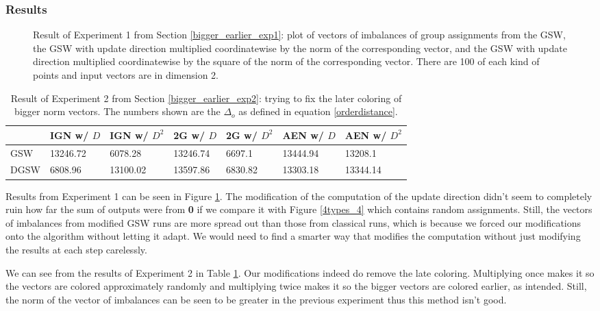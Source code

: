 \documentclass[12pt]{article}
\begin{document}
\subsubsection{Results}
\begin{figure}[h!]

\caption{Result of Experiment 1 from Section \ref{bigger_earlier_exp1}: plot of vectors of imbalances of group assignments from the GSW, the GSW with update direction multiplied coordinatewise by the norm of the corresponding vector, and the GSW with update direction multiplied coordinatewise by the square of the norm of the corresponding vector. There are 100 of each kind of points and input vectors are in dimension 2.}\label{3_types_d_and_i}
\end{figure}
\begin{table}[h!]
\centering
\caption{Result of Experiment 2 from Section \ref{bigger_earlier_exp2}: trying to fix the later coloring of bigger norm vectors. The numbers shown are the $\Delta_o$ as defined in equation \ref{orderdistance}.}
\begin{tabular}{l|llllll}
 &IGN w/ $D$&IGN w/ $D^2$& 2G w/ $D$&2G w/ $D^2$& AEN w/ $D$&AEN w/ $D^2$   \\
\hline
GSW&13246.72&6078.28&13246.74&6697.1&13444.94&13208.1\\
DGSW&6808.96&13100.02&13597.86&6830.82&13303.18&13344.14
\end{tabular}
\label{norm_earlier}
\end{table}

Results from Experiment 1 can be seen in Figure \ref{3_types_d_and_i}. The modification of the computation of the update direction didn't seem to completely ruin how far the sum of outputs were from \textbf{0} if we compare it with Figure \ref{4types_4} which contains random assignments. Still, the vectors of imbalances  from modified GSW runs are more spread out than those from classical runs, which is because we forced our modifications onto the algorithm without letting it adapt. We would need to find a smarter way that modifies the computation without just modifying the results at each step carelessly.

We can see from the results of Experiment 2 in Table \ref{norm_earlier}. Our modifications indeed do remove the late coloring. Multiplying once makes it so the vectors are colored approximately randomly and multiplying twice makes it so the bigger vectors are colored earlier, as intended. Still, the norm of the vector of imbalances can be seen to be greater in the previous experiment thus this method isn't good.
\end{document}
